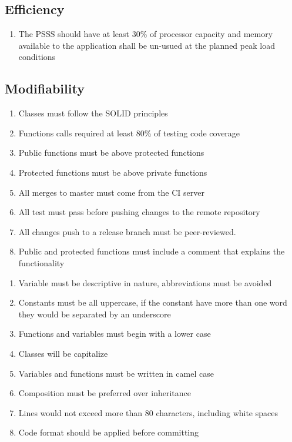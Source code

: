 \subsection{Efficiency}
\begin{enumerate}[label=EFF-\arabic*]
    \item The PSSS should have at least 30\% of processor capacity and memory 
    available to the application shall be un-usued at the planned 
    peak load conditions
\end{enumerate}

\subsection{Modifiability}
\begin{enumerate}[label=MOD-\arabic*]
    \item Classes must follow the SOLID principles
    \item Functions calls required at least 80\% of testing code coverage
    \item Public functions must be above protected functions
    \item Protected functions must be above private functions
    \item All merges to master must come from the CI server
    \item All test must pass before pushing changes to the remote repository
    \item All changes push to a release branch must be peer-reviewed.
    \item Public and protected functions must include a comment that explains 
    the functionality
\end{enumerate}
\pagebreak
\begin{enumerate}[resume, label=MOD-\arabic*]
    \item Variable must be descriptive in nature, abbreviations must be avoided
    \item Constants must be all uppercase, if the constant have more than one 
    word they would be separated by an underscore
    \item Functions and variables must begin with a lower case
    \item Classes will be capitalize
    \item Variables and functions must be written in camel case
    \item Composition must be preferred over inheritance
    \item Lines would not exceed more than 80 characters, including white 
    spaces
    \item Code format should be applied before committing
\end{enumerate}

